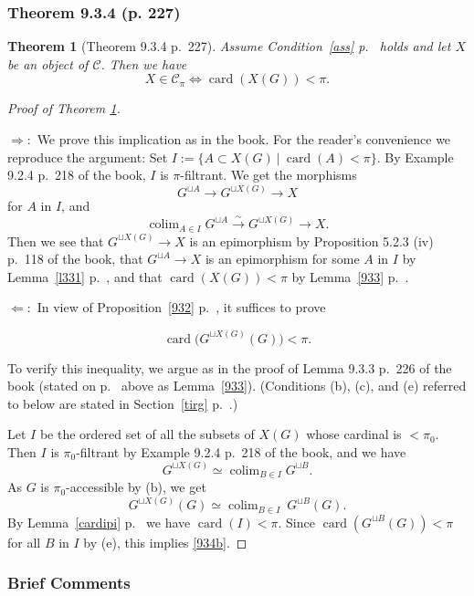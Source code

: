 \documentclass[12pt]{article}
\newtheorem{thm}{Theorem}
\theoremstyle{remark}
\theoremstyle{definition}
\newcommand{\nn}{\noindent}
\newcommand{\C}{\mathcal C}
\newcommand{\si}{\Leftarrow}
\newcommand{\ssi}{\Leftrightarrow}
\newcommand{\then}{\Rightarrow}
\newcommand{\xr}{\xrightarrow}
\DeclareMathOperator*{\colim}{colim}
\DeclareMathOperator{\card}{card}
\begin{document}
\subsubsection{Theorem 9.3.4 (p. 227)}

\begin{thm}[Theorem 9.3.4 p.~227]\label{934}
Assume Condition~\ref{ass} p.~\pageref{ass} holds and let $X$ be an object of $\C$. Then we have 
$$
X\in\C_\pi\ssi\card(X(G))<\pi.
$$ 
\end{thm}

\begin{proof}[Proof of Theorem \ref{934}]${}$

\nn$\then:$ We prove this implication as in the book. For the reader's convenience we reproduce the argument: Set $I:=\{A\subset X(G)\ |\ \card(A)<\pi\}$. By Example 9.2.4 p.~218 of the book, $I$ is $\pi$-filtrant. We get the morphisms 
$$
G^{\sqcup A}\to G^{\sqcup X(G)}\to X
$$ 
for $A$ in $I$, and 
$$
\colim_{A\in I}G^{\sqcup A}\xr\sim G^{\sqcup X(G)}\to X.
$$ 
Then we see that $G^{\sqcup X(G)}\to X$ is an epimorphism by Proposition 5.2.3 (iv) p.~118 of the book, that $G^{\sqcup A}\to X$ is an epimorphism for some $A$ in $I$ by Lemma~\ref{l331} p.~\pageref{l331}, and that $\card(X(G))<\pi$ by Lemma~\ref{933} p.~\pageref{933}.

\nn$\si:$ In view of Proposition~\ref{932} p.~\pageref{932}, it suffices to prove  

\begin{equation}\label{934b}
\card\big(G^{\sqcup X(G)}(G)\big)<\pi.
\end{equation} 

To verify this inequality, we argue as in the proof of Lemma 9.3.3 p.~226 of the book (stated on p.~\pageref{933} above as Lemma~\ref{933}). (Conditions (b), (c), and (e) referred to below are stated in Section~\ref{tirg} p.~\pageref{tirg}.)

Let $I$ be the ordered set of all the subsets of $X(G)$ whose cardinal is $<\pi_0$. Then $I$ is $\pi_0$-filtrant by Example 9.2.4 p.~218 of the book, and we have 
$$
G^{\sqcup X(G)}\simeq\colim_{B\in I}G^{\sqcup B}.
$$ 
As $G$ is $\pi_0$-accessible by (b), we get 
$$
G^{\sqcup X(G)}(G)\simeq\colim_{B\in I}\ G^{\sqcup B}(G).
$$ 
By Lemma~\ref{cardipi} p.~\pageref{cardipi} we have $\card(I)<\pi$. Since $\card(G^{\sqcup B}(G))<\pi$ for all $B$ in $I$ by (e), this implies \eqref{934b}.
\end{proof}

\subsubsection{Brief Comments}
\end{document}
